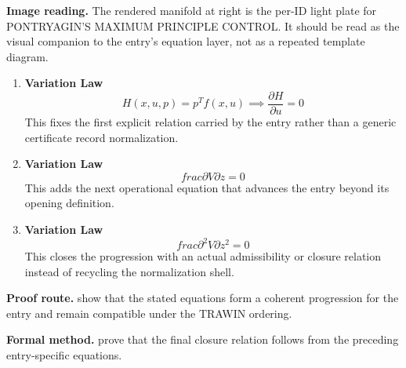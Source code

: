 \begin{samepage}
\noindent\begin{minipage}[t]{0.45\linewidth}
\vspace{0pt}
\raggedright
\scriptsize\textbf{Image reading.} The rendered manifold at right is the per-ID light plate for PONTRYAGIN'S MAXIMUM PRINCIPLE CONTROL. It should be read as the visual companion to the entry's equation layer, not as a repeated template diagram.\par
\end{minipage}\hfill
\begin{minipage}[t]{0.53\linewidth}
\vspace*{-0.10in}
\raggedright
{}
\end{minipage}
\end{samepage}

\clearpage


\begin{enumerate}[leftmargin=1.6em,itemsep=9pt,topsep=6pt]
\item \textbf{Variation Law}
\[
H(x,u,p) = p^T f(x,u) \implies \frac{\partial H}{\partial u} = 0
\]
This fixes the first explicit relation carried by the entry rather than a generic certificate record normalization.

\item \textbf{Variation Law}
\[
frac{\partial V}{\partial z} = 0
\]
This adds the next operational equation that advances the entry beyond its opening definition.

\item \textbf{Variation Law}
\[
frac{\partial^{2} V}{\partial z^{2}} = 0
\]
This closes the progression with an actual admissibility or closure relation instead of recycling the normalization shell.
\end{enumerate}

\textbf{Proof route.} show that the stated equations form a coherent progression for the entry and remain compatible under the TRAWIN ordering.

\textbf{Formal method.} prove that the final closure relation follows from the preceding entry-specific equations.

\medskip
{}

